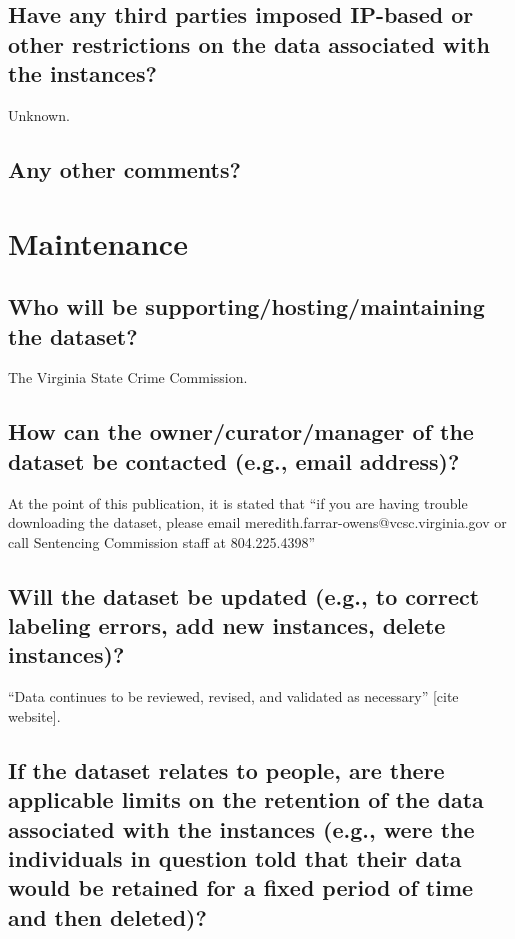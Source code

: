 \documentclass[letterpaper, 10 pt, conference]{ieeeconf}  %
\begin{document}
\subsection{Have any third parties imposed IP-based or other restrictions on the data associated with the instances?}

Unknown. 


\subsection{Any other comments?}

\section{Maintenance}

\subsection{Who will be supporting/hosting/maintaining the dataset?}

The Virginia State Crime Commission. 

\subsection{How can the owner/curator/manager of the dataset be contacted (e.g., email address)?}

At the point of this publication, it is stated that ``if you are having trouble downloading the dataset, please email meredith.farrar-owens@vcsc.virginia.gov or call Sentencing Commission staff at 804.225.4398'' 

\subsection{Will the dataset be updated (e.g., to correct labeling errors, add new instances, delete instances)?}

``Data continues to be reviewed, revised, and validated as necessary'' [cite website].

\subsection{If the dataset relates to people, are there applicable limits on the retention of the data associated with the instances (e.g., were the individuals in question told that their data would be retained for a fixed period of time and then deleted)?}
\end{document}
